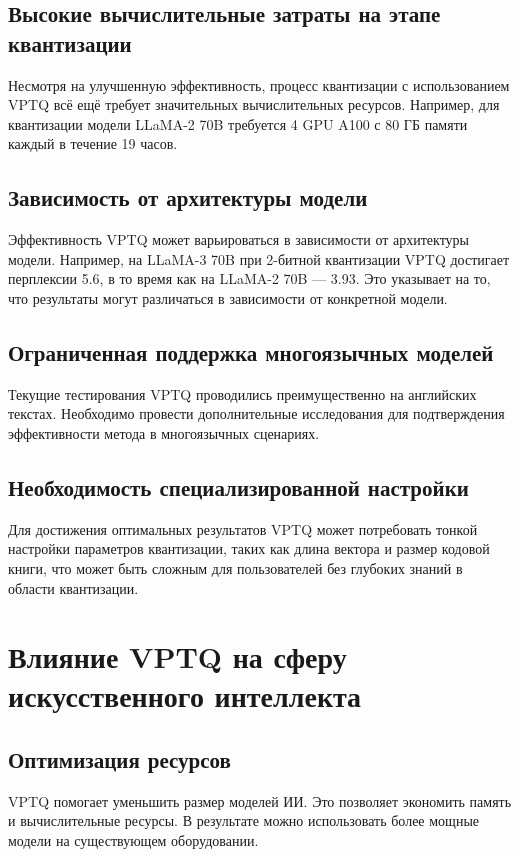 \documentclass{article}
\begin{document}
\subsection{Высокие вычислительные затраты на этапе квантизации}
Несмотря на улучшенную эффективность, процесс квантизации с использованием VPTQ всё ещё требует значительных вычислительных ресурсов. Например, для квантизации модели LLaMA-2 70B требуется 4 GPU A100 с 80 ГБ памяти каждый в течение 19 часов.

\subsection{Зависимость от архитектуры модели}
Эффективность VPTQ может варьироваться в зависимости от архитектуры модели. Например, на LLaMA-3 70B при 2-битной квантизации VPTQ достигает перплексии 5.6, в то время как на LLaMA-2 70B — 3.93. Это указывает на то, что результаты могут различаться в зависимости от конкретной модели.

\subsection{Ограниченная поддержка многоязычных моделей}
Текущие тестирования VPTQ проводились преимущественно на английских текстах. Необходимо провести дополнительные исследования для подтверждения эффективности метода в многоязычных сценариях.

\subsection{Необходимость специализированной настройки}
Для достижения оптимальных результатов VPTQ может потребовать тонкой настройки параметров квантизации, таких как длина вектора и размер кодовой книги, что может быть сложным для пользователей без глубоких знаний в области квантизации.

\section{Влияние VPTQ на сферу искусственного интеллекта}

\subsection{Оптимизация ресурсов}
VPTQ помогает уменьшить размер моделей ИИ. Это позволяет экономить память и вычислительные ресурсы. В результате можно использовать более мощные модели на существующем оборудовании.
\end{document}
